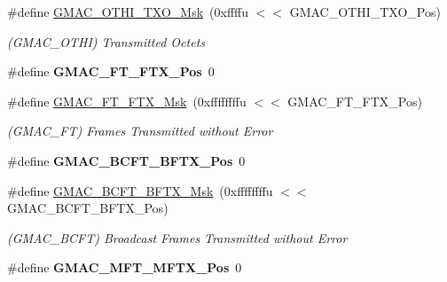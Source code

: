 \begin{DoxyCompactItemize}
\#define \mbox{\hyperlink{group__SAMV71__GMAC_ga8bb4ed4d1393068e148b0d4701ba6193}{G\+M\+A\+C\+\_\+\+O\+T\+H\+I\+\_\+\+T\+X\+O\+\_\+\+Msk}}~(0xffffu $<$$<$ G\+M\+A\+C\+\_\+\+O\+T\+H\+I\+\_\+\+T\+X\+O\+\_\+\+Pos)
\begin{DoxyCompactList}\small\item\em (G\+M\+A\+C\+\_\+\+O\+T\+HI) Transmitted Octets \end{DoxyCompactList}\item 
\mbox{\label{group__SAMV71__GMAC_ga17259f2295eb23071be5e4edb111be1e}} 
\#define {\bfseries G\+M\+A\+C\+\_\+\+F\+T\+\_\+\+F\+T\+X\+\_\+\+Pos}~0
\item 
\mbox{\label{group__SAMV71__GMAC_ga5bd97b6adfa8cf8f3be321fcbf49d398}} 
\#define \mbox{\hyperlink{group__SAMV71__GMAC_ga5bd97b6adfa8cf8f3be321fcbf49d398}{G\+M\+A\+C\+\_\+\+F\+T\+\_\+\+F\+T\+X\+\_\+\+Msk}}~(0xffffffffu $<$$<$ G\+M\+A\+C\+\_\+\+F\+T\+\_\+\+F\+T\+X\+\_\+\+Pos)
\begin{DoxyCompactList}\small\item\em (G\+M\+A\+C\+\_\+\+FT) Frames Transmitted without Error \end{DoxyCompactList}\item 
\mbox{\label{group__SAMV71__GMAC_gaa4b9b053621122f22d2fe589b88b2703}} 
\#define {\bfseries G\+M\+A\+C\+\_\+\+B\+C\+F\+T\+\_\+\+B\+F\+T\+X\+\_\+\+Pos}~0
\item 
\mbox{\label{group__SAMV71__GMAC_ga3ed88179ac9dd969cdebd55f76a5d230}} 
\#define \mbox{\hyperlink{group__SAMV71__GMAC_ga3ed88179ac9dd969cdebd55f76a5d230}{G\+M\+A\+C\+\_\+\+B\+C\+F\+T\+\_\+\+B\+F\+T\+X\+\_\+\+Msk}}~(0xffffffffu $<$$<$ G\+M\+A\+C\+\_\+\+B\+C\+F\+T\+\_\+\+B\+F\+T\+X\+\_\+\+Pos)
\begin{DoxyCompactList}\small\item\em (G\+M\+A\+C\+\_\+\+B\+C\+FT) Broadcast Frames Transmitted without Error \end{DoxyCompactList}\item 
\mbox{\label{group__SAMV71__GMAC_ga5ae60d81b5df40bdeb3d4e99c6c3ea69}} 
\#define {\bfseries G\+M\+A\+C\+\_\+\+M\+F\+T\+\_\+\+M\+F\+T\+X\+\_\+\+Pos}~0
\item 
\mbox{\label{group__SAMV71__GMAC_ga3567bb3ed49010afbb2252ca4b62cc35}} 
$$
\end{DoxyCompactItemize}
